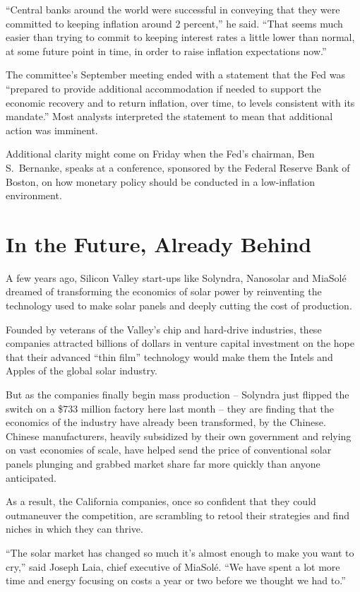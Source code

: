 ﻿\documentclass[12pt]{article}
\begin{document}
``Central banks around the world were successful in conveying that they were committed to keeping
inflation around 2 percent,'' he said. ``That seems much easier than trying to commit to keeping
interest rates a little lower than normal, at some future point in time, in order to raise inflation
expectations now.''

The committee's September meeting ended with a statement that the Fed was ``prepared to provide
additional accommodation if needed to support the economic recovery and to return inflation, over
time, to levels consistent with its mandate.'' Most analysts interpreted the statement to mean that
additional action was imminent.

Additional clarity might come on Friday when the Fed's chairman, Ben S.~Bernanke, speaks at a
conference, sponsored by the Federal Reserve Bank of Boston, on how monetary policy should be
conducted in a low-inflation environment.

\section{In the Future, Already Behind}

\lettrine{A}{} few years ago, Silicon Valley start-ups like Solyndra,
Nanosolar and MiaSol\'e dreamed of transforming the economics of solar power by reinventing the
technology used to make solar panels and deeply cutting the cost of production.

Founded by veterans of the Valley's chip and hard-drive industries, these companies attracted
billions of dollars in venture capital investment on the hope that their advanced ``thin film''
technology would make them the Intels and Apples of the global solar industry.

But as the companies finally begin mass production -- Solyndra just flipped the switch on a \$733
million factory here last month -- they are finding that the economics of the industry have already
been transformed, by the Chinese. Chinese manufacturers, heavily subsidized by their own government
and relying on vast economies of scale, have helped send the price of conventional solar panels
plunging and grabbed market share far more quickly than anyone anticipated.

As a result, the California companies, once so confident that they could outmaneuver the
competition, are scrambling to retool their strategies and find niches in which they can thrive.

``The solar market has changed so much it's almost enough to make you want to cry,'' said Joseph
Laia, chief executive of MiaSol\'e. ``We have spent a lot more time and energy focusing on costs a
year or two before we thought we had to.''
\end{document}

